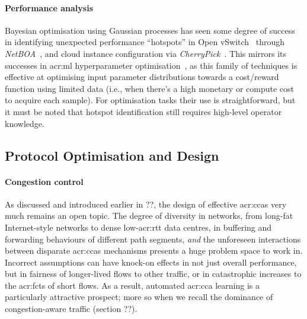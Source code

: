 \paragraph{Performance analysis}
Bayesian optimisation using Gaussian processes has seen some degree of success in identifying unexpected performance ``hotspots'' in Open vSwitch~\parencite{DBLP:conf/nsdi/PfaffPKJZRGWSSA15} through \emph{NetBOA}~\parencite{DBLP:conf/sigcomm/ZerwasKHRKB019}, and cloud instance configuration via \emph{CherryPick}~\parencite{DBLP:conf/nsdi/AlipourfardLCVY17}.
This mirrors its successes in \gls{acr:ml} hyperparameter optimisation~\parencite{DBLP:conf/lion/HutterHL11,DBLP:conf/aaai/FeurerSH15}, as this family of techniques is effective at optimising input parameter distributions towards a cost/reward function using limited data (i.e., when there's a high monetary or compute cost to acquire each sample).
For optimisation tasks their use is straightforward, but it must be noted that hotspot identification still requires high-level operator knowledge.

\subsection{Protocol Optimisation and Design}
\paragraph{Congestion control}
As discussed and introduced earlier in ??, the design of effective \glspl{acr:cca} very much remains an open topic.
The degree of diversity in networks, from long-fat Internet-style networks to dense low-\gls{acr:rtt} data centres, in buffering and forwarding behaviours of different path segments, \emph{and} the unforeseen interactions between disparate \glspl{acr:cca} mechanisms presents a huge problem space to work in.
Incorrect assumptions can have knock-on effects in not just overall performance, but in fairness of longer-lived flows to other traffic, or in catastrophic increases to the \glspl{acr:fct} of short flows.
As a result, automated \gls{acr:cca} learning is a particularly attractive prospect; more so when we recall the dominance of congestion-aware traffic (section ??).

